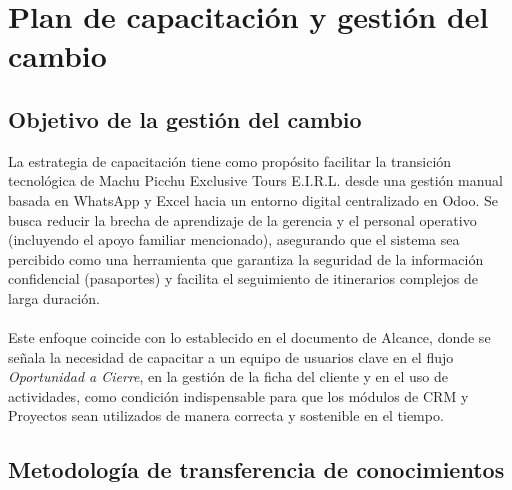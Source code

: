 \section{Plan de capacitación y gestión del cambio}

\subsection{Objetivo de la gestión del cambio}

\begin{indentedsubsection}
La estrategia de capacitación tiene como propósito facilitar la transición tecnológica de Machu Picchu Exclusive Tours E.I.R.L. desde una gestión manual basada en WhatsApp y Excel hacia un entorno digital centralizado en Odoo. Se busca reducir la brecha de aprendizaje de la gerencia y el personal operativo (incluyendo el apoyo familiar mencionado), asegurando que el sistema sea percibido como una herramienta que garantiza la seguridad de la información confidencial (pasaportes) y facilita el seguimiento de itinerarios complejos de larga duración.
\\
\\
Este enfoque coincide con lo establecido en el documento de Alcance, donde se señala la necesidad de capacitar a un equipo de usuarios clave en el flujo \emph{Oportunidad a Cierre}, en la gestión de la ficha del cliente y en el uso de actividades, como condición indispensable para que los módulos de CRM y Proyectos sean utilizados de manera correcta y sostenible en el tiempo.

\end{indentedsubsection}

\subsection{Metodología de transferencia de conocimientos}

